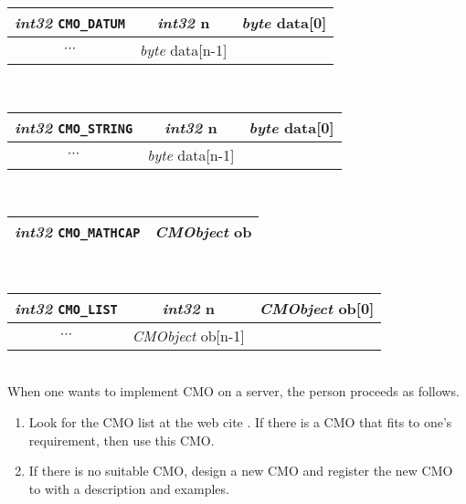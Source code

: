 \begin{tabular}{|c|c|c|}
\hline
{\sl int32} {\tt CMO\_DATUM}& {\sl int32} {\rm n} & {\sl byte} {\rm  data[0]} \\
\hline
$\cdots$ & {\sl byte} {\rm  data[n-1]} \\ 
\cline{1-2}
\end{tabular} \\
\begin{tabular}{|c|c|c|}
\hline
{\sl int32} {\tt CMO\_STRING}& {\sl int32} {\rm n} & {\sl byte} {\rm data[0]} \\
\hline
$\cdots$ & {\sl byte} {\rm data[n-1]} \\ 
\cline{1-2}
\end{tabular} \\
\begin{tabular}{|c|c|}
\hline
{\sl int32} {\tt CMO\_MATHCAP} & {\sl CMObject} {\rm ob} \\ 
\hline
\end{tabular} \\
\begin{tabular}{|c|c|c|}
\hline
{\sl int32} {\tt CMO\_LIST}& {\sl int32} {\rm n} & {\sl CMObject} {\rm ob[0]} \\
\hline
$\cdots$ & {\sl CMObject} {\rm ob[n-1]} \\ 
\cline{1-2}
\end{tabular} \\

When one wants to implement CMO on a server, the person proceeds 
as follows.
\begin{enumerate}
\item Look for the CMO list at the web cite \cite{openxm-web}.
If there is a CMO that fits to one's requirement, then use this CMO.     
\item If there is no suitable CMO, design a new CMO and register 
the new CMO to \cite{openxm-web} with a description and examples.
\end{enumerate}
